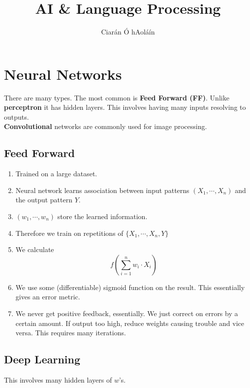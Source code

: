 \documentclass{article}
\title{AI \& Language Processing}
\author{Ciarán Ó hAoláín}
\begin{document}
	\maketitle
	
	\section{Neural Networks}
	There are many types. The most common is \textbf{Feed Forward (FF)}. Unlike \textbf{perceptron} it has hidden layers.
	This involves having many inputs resolving to outputs.\\
	\textbf{Convolutional} networks are commonly used for image processing.
	
	\subsection{Feed Forward}
	\begin{enumerate}
		\item 	Trained on a large dataset. 
		\item Neural network learns association between input patterns $(X_1,\cdots,X_n)$ and the output pattern $Y$.
		\item $(w_1,\cdots,w_n)$ store the learned information.
		\item Therefore we train on repetitions of $\{X_1,\cdots,X_n,Y\}$
		\item We calculate \[ f \left( \sum_{i=1}^{n} w_i \cdot X_i \right) \]
		\item We use some (differentiable) sigmoid function on the result. This essentially gives an error metric.
		\item We never get positive feedback, essentially. We just correct on errors by a certain amount.
		\subitem If output too high, reduce weights causing trouble and vice versa.
		\subitem This requires many iterations.
	\end{enumerate}

	\subsection{Deep Learning}
	This involves many hidden layers of $w$'s.
	
\end{document}
